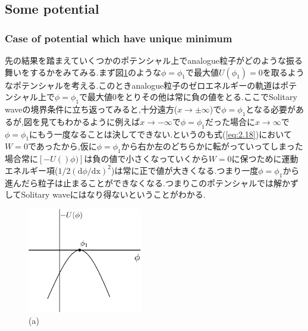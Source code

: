 \documentclass[dvipdfmx,11pt,a4paper,oneside,openany]{jsbook}
\begin{document}
\subsection{Some potential}
\subsubsection{Case of potential which have unique minimum}
先の結果を踏まえていくつかのポテンシャル上でanalogue粒子がどのような振る舞いをするかをみてみる.まず図\ref{potential1}のような$\phi=\phi_1$で最大値$U(\phi_1)=0$を取るようなポテンシャルを考える.このときanalogue粒子のゼロエネルギーの軌道はポテンシャル上で$\phi=\phi_1$で最大値0をとりその他は常に負の値をとる.ここでSolitary waveの境界条件に立ち返ってみると,十分遠方($x\rightarrow \pm \infty$)で$\phi=\phi_1$となる必要があるが,図を見てもわかるように例えば$x\rightarrow -\infty$で$\phi=\phi_1$だった場合に$x\rightarrow \infty$で$\phi=\phi_1$にもう一度なることは決してできない.というのも式(\ref{eq:2.18})において$W=0$であったから,仮に$\phi=\phi_1$から右か左のどちらかに転がっていってしまった場合常に$[-U()\phi)]$は負の値で小さくなっていくから$W=0$に保つために運動エネルギー項($1/2(\mathrm{d}\phi/\mathrm{dx})^2$)は常に正で値が大きくなる.つまり一度$\phi=\phi_1$から進んだら粒子は止まることができなくなる.つまりこのポテンシャルでは解かずしてSolitary waveにはなり得ないということがわかる.

\begin{figure}[H]
    \centering
    \includegraphics[width=5cm]{figure/potential1.png}
    \caption{(a)}
    \label{potential1}
\end{figure}
\end{document}

